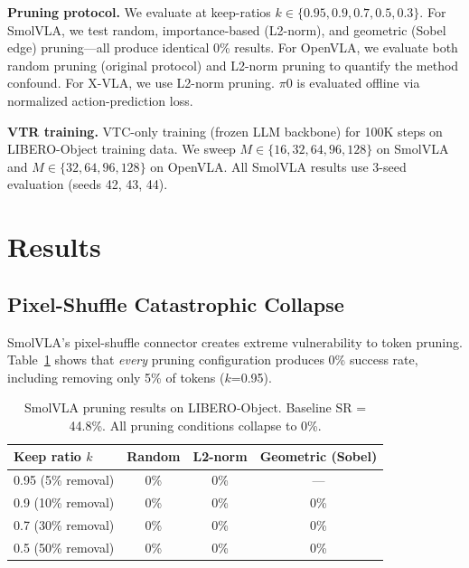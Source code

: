 \documentclass[letterpaper]{article}
\begin{document}
\textbf{Pruning protocol.}
We evaluate at keep-ratios $k \in \{0.95, 0.9, 0.7, 0.5, 0.3\}$.
For SmolVLA, we test random, importance-based (L2-norm), and geometric (Sobel edge) pruning---all produce identical 0\% results.
For OpenVLA, we evaluate both random pruning (original protocol) and L2-norm pruning to quantify the method confound.
For X-VLA, we use L2-norm pruning.
$\pi$0 is evaluated offline via normalized action-prediction loss.

\textbf{VTR training.}
VTC-only training (frozen LLM backbone) for 100K steps on LIBERO-Object training data.
We sweep $M \in \{16, 32, 64, 96, 128\}$ on SmolVLA and $M \in \{32, 64, 96, 128\}$ on OpenVLA.
All SmolVLA results use 3-seed evaluation (seeds 42, 43, 44).

\section{Results}
\label{sec:results}

\subsection{Pixel-Shuffle Catastrophic Collapse}
\label{sec:pixel-shuffle}

SmolVLA's pixel-shuffle connector creates extreme vulnerability to token pruning.
Table~\ref{tab:smolvla_cliff} shows that \emph{every} pruning configuration produces 0\% success rate, including removing only 5\% of tokens ($k$=0.95).

\begin{table}[h]
\centering
\caption{SmolVLA pruning results on LIBERO-Object. Baseline SR = 44.8\%. All pruning conditions collapse to 0\%.}
\label{tab:smolvla_cliff}
\begin{tabular}{lccc}
\toprule
\textbf{Keep ratio $k$} & \textbf{Random} & \textbf{L2-norm} & \textbf{Geometric (Sobel)} \\
\midrule
0.95 (5\% removal) & 0\% & 0\% & --- \\
0.9 (10\% removal) & 0\% & 0\% & 0\% \\
0.7 (30\% removal) & 0\% & 0\% & 0\% \\
0.5 (50\% removal) & 0\% & 0\% & 0\% \\
\bottomrule
\end{tabular}
\end{table}
\end{document}
